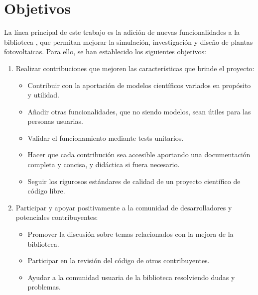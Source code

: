 \section{Objetivos} \label{sct:intro:objetivos}

La línea principal de este trabajo es la adición de nuevas funcionalidades a la biblioteca \pvlibpy, que permitan mejorar la simulación, investigación y diseño de plantas fotovoltaicas. Para ello, se han establecido los siguientes objetivos:

\begin{enumerate}

    \item Realizar contribuciones que mejoren las características que brinde el proyecto:
    
    \begin{itemize}
        \item Contribuir con la aportación de modelos científicos variados en propósito y utilidad.

        \item Añadir otras funcionalidades, que no siendo modelos, sean útiles para las personas usuarias.
    
        \item Validar el funcionamiento mediante tests unitarios.
    
        \item Hacer que cada contribución sea accesible aportando una \gls{documentación} completa y concisa, y didáctica si fuera necesario.
    
        \item Seguir los rigurosos estándares de calidad de un proyecto científico de código libre.
    \end{itemize}

    \item Participar y apoyar positivamente a la comunidad de desarrolladores y potenciales contribuyentes:
    
    \begin{itemize}
        \item Promover la discusión sobre temas relacionados con la mejora de la biblioteca.

        \item Participar en la revisión del código de otros contribuyentes.
    
        \item Ayudar a la comunidad usuaria de la biblioteca resolviendo dudas y problemas.
    

\end{itemize}
\end{enumerate}
